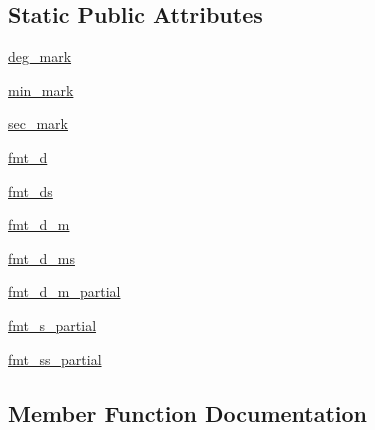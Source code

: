 \subsection*{Static Public Attributes}
\begin{DoxyCompactItemize}
\item 
\hyperlink{classaxisartist_1_1angle__helper_1_1FormatterDMS_ad5fd69979b5f4e5d0be310ee56c36527}{deg\+\_\+mark}
\item 
\hyperlink{classaxisartist_1_1angle__helper_1_1FormatterDMS_a3f9cc84023357f60408720e94e773776}{min\+\_\+mark}
\item 
\hyperlink{classaxisartist_1_1angle__helper_1_1FormatterDMS_abb8af222c3e03138ea72ad222baed740}{sec\+\_\+mark}
\item 
\hyperlink{classaxisartist_1_1angle__helper_1_1FormatterDMS_a5730ebe6a32c9a5ee796632bd90a3629}{fmt\+\_\+d}
\item 
\hyperlink{classaxisartist_1_1angle__helper_1_1FormatterDMS_aa0a8a0cbe5f45ace99f93f7c34781400}{fmt\+\_\+ds}
\item 
\hyperlink{classaxisartist_1_1angle__helper_1_1FormatterDMS_a9901ab8136ee82f46310b02010e5c00e}{fmt\+\_\+d\+\_\+m}
\item 
\hyperlink{classaxisartist_1_1angle__helper_1_1FormatterDMS_a163a92f38016eded97e76c6da49384e9}{fmt\+\_\+d\+\_\+ms}
\item 
\hyperlink{classaxisartist_1_1angle__helper_1_1FormatterDMS_ac4cbf384f812b64ab4dfb55b3c0341c0}{fmt\+\_\+d\+\_\+m\+\_\+partial}
\item 
\hyperlink{classaxisartist_1_1angle__helper_1_1FormatterDMS_a7e25cc5976265cbccfde51b3948c1dba}{fmt\+\_\+s\+\_\+partial}
\item 
\hyperlink{classaxisartist_1_1angle__helper_1_1FormatterDMS_aeb2d1eeb6f6be0c5461ede29e62c63dd}{fmt\+\_\+ss\+\_\+partial}
\end{DoxyCompactItemize}


\subsection{Member Function Documentation}
\mbox{\label{classaxisartist_1_1angle__helper_1_1FormatterDMS_a077bdf24d991760ff921c26fdefe2cb1}} 
